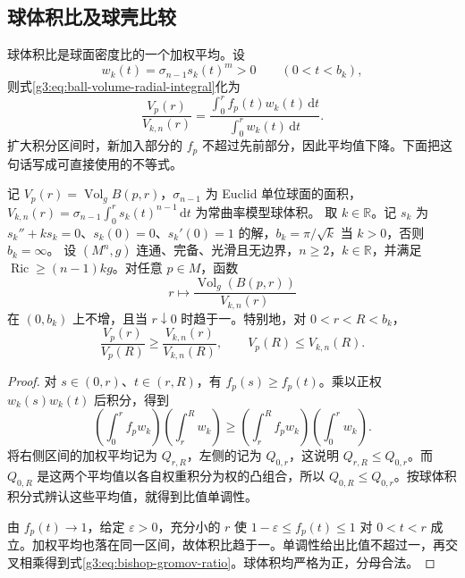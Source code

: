 \subsection{球体积比及球壳比较}
\label{g3:subsec:0802:03}

球体积比是球面密度比的一个加权平均。设
\[
	w_k(t)=\sigma_{n-1}s_k(t)^m>0\qquad(0<t<b_k),
\]
则式\eqref{g3:eq:ball-volume-radial-integral}化为
\[
	\frac{V_p(r)}{V_{k,n}(r)}
	=\frac{\int_0^r f_p(t)w_k(t)\,\mathrm dt}{\int_0^r w_k(t)\,\mathrm dt}.
\]
扩大积分区间时，新加入部分的 \(f_p\) 不超过先前部分，因此平均值下降。下面把这句话写成可直接使用的不等式。

\begin{theorem}\label{g3:thm:bishop-gromov}
	记 \(V_p(r)=\operatorname{Vol}_g B(p,r)\)，\(\sigma_{n-1}\) 为 Euclid 单位球面的面积，\(V_{k,n}(r)=\sigma_{n-1}\int_0^r s_k(t)^{n-1}\,\mathrm dt\) 为常曲率模型球体积。
	取 \(k\in\mathbb R\)。记 \(s_k\) 为 \(s_k''+ks_k=0\)、\(s_k(0)=0\)、\(s_k'(0)=1\) 的解，\(b_k=\pi/\sqrt k\) 当 \(k>0\)，否则 \(b_k=\infty\)。
	设 \((M^n,g)\) 连通、完备、光滑且无边界，\(n\ge2\)，\(k\in\mathbb R\)，并满足 \(\operatorname{Ric}\ge(n-1)kg\)。对任意 \(p\in M\)，函数
	\[
		r\longmapsto\frac{\operatorname{Vol}_g(B(p,r))}{V_{k,n}(r)}
	\]
	在 \((0,b_k)\) 上不增，且当 \(r\downarrow0\) 时趋于一。特别地，对 \(0<r<R<b_k\)，
	\begin{equation}\label{g3:eq:bishop-gromov-ratio}
		\frac{V_p(r)}{V_p(R)}\ge\frac{V_{k,n}(r)}{V_{k,n}(R)},
		\qquad V_p(R)\le V_{k,n}(R).
	\end{equation}
\end{theorem}
\begin{proof}
	对 \(s\in(0,r)\)、\(t\in(r,R)\)，有 \(f_p(s)\ge f_p(t)\)。乘以正权 \(w_k(s)w_k(t)\) 后积分，得到
	\[
		\left(\int_0^r f_pw_k\right)\left(\int_r^R w_k\right)
		\ge\left(\int_r^R f_pw_k\right)\left(\int_0^r w_k\right).
	\]
	将右侧区间的加权平均记为 \(Q_{r,R}\)，左侧的记为 \(Q_{0,r}\)，这说明 \(Q_{r,R}\le Q_{0,r}\)。而 \(Q_{0,R}\) 是这两个平均值以各自权重积分为权的凸组合，所以 \(Q_{0,R}\le Q_{0,r}\)。按球体积积分式辨认这些平均值，就得到比值单调性。

	由 \(f_p(t)\to1\)，给定 \(\varepsilon>0\)，充分小的 \(r\) 使 \(1-\varepsilon\le f_p(t)\le1\) 对 \(0<t<r\) 成立。加权平均也落在同一区间，故体积比趋于一。单调性给出比值不超过一，再交叉相乘得到式\eqref{g3:eq:bishop-gromov-ratio}。球体积均严格为正，分母合法。
\end{proof}


